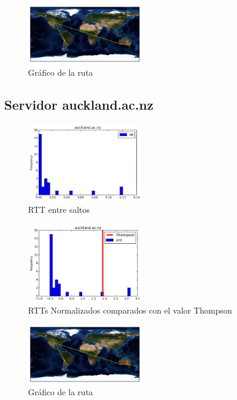 \begin{figure}[H]
  \centering
    \includegraphics[width=0.45\textwidth]{grafico-rutas/www-uq-edu-au.png}
  \caption{Gráfico de la ruta}
  \label{entropia-s}
\end{figure}





\subsection{Servidor auckland.ac.nz}
\begin{figure}[H]
  \centering
    \includegraphics[width=0.45\textwidth]{histogramas_rtt/auckland-ac-nz.png}
  \caption{RTT entre saltos}
  \label{entropia-s}
\end{figure}

\begin{figure}[H]
  \centering
    \includegraphics[width=0.45\textwidth]{histogramas_thompson/auckland-ac-nz.png}
  \caption{RTTs Normalizados comparados con el valor Thompson}
  \label{entropia-s}
\end{figure}

\begin{figure}[H]
  \centering
    \includegraphics[width=0.45\textwidth]{grafico-rutas/auckland-ac-nz.png}
  \caption{Gráfico de la ruta}
  \label{entropia-s}
\end{figure}




